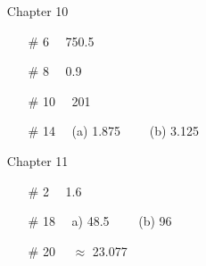 \documentclass[12pt]{article}
\begin{document}
\begin{itemize}
\item[] Chapter 10          \label{ANS_10}
\begin{itemize}
	\item[\# 6] \ \   750.5
	\item[\# 8] \ \   0.9
	\item[\# 10] \ \  201
	\item[ \# 14]\  \  (a)  1.875 \ \ \ \ (b) 3.125 \ \ \ \ 
\end{itemize}


\item[] Chapter 11          \label{ANS_11}
	\begin{itemize}
	\item[\# 2] \ \  1.6
	\item[\# 18] \ \  a)  48.5 \ \ \ \ (b) 96 \ \ \ \ 
	\item[\# 20] \ \  $\approx$ 23.077	
\end{itemize}




%



\end{itemize}
\end{document}
